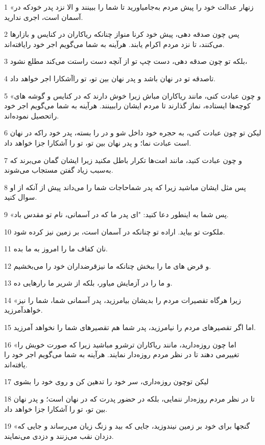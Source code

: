 \par 1 «زنهار عدالت خود را پیش مردم به‌جامیاورید تا شما را ببینند و الا نزد پدر خودکه در آسمان است، اجری ندارید.
\par 2 پس چون صدقه دهی، پیش خود کرنا منواز چنانکه ریاکاران در کنایس و بازارها می‌کنند، تا نزد مردم اکرام یابند. هرآینه به شما می‌گویم اجر خود رایافته‌اند.
\par 3 بلکه تو چون صدقه دهی، دست چپ تو از آنچه دست راستت می‌کند مطلع نشود،
\par 4 تاصدقه تو در نهان باشد و پدر نهان بین تو، تو راآشکارا اجر خواهد داد.
\par 5 «و چون عبادت کنی، مانند ریاکاران مباش زیرا خوش دارند که در کنایس و گوشه های کوچه‌ها ایستاده، نماز گذارند تا مردم ایشان راببینند. هرآینه به شما می‌گویم اجر خود راتحصیل نموده‌اند.
\par 6 لیکن تو چون عبادت کنی، به حجره خود داخل شو و در را بسته، پدر خود راکه در نهان است عبادت نما؛ و پدر نهان بین تو، تو را آشکارا جزا خواهد داد.
\par 7 و چون عبادت کنید، مانند امت‌ها تکرار باطل مکنید زیرا ایشان گمان می‌برند که به‌سبب زیاد گفتن مستجاب می‌شوند.
\par 8 پس مثل ایشان مباشید زیرا که پدر شماحاجات شما را می‌داند پیش از آنکه از او سوال کنید.
\par 9 «پس شما به اینطور دعا کنید: "ای پدر ما که در آسمانی، نام تو مقدس باد.
\par 10 ملکوت تو بیاید. اراده تو چنانکه در آسمان است، بر زمین نیز کرده شود.
\par 11 نان کفاف ما را امروز به ما بده.
\par 12 و قرض های ما را ببخش چنانکه ما نیزقرضداران خود را می‌بخشیم.
\par 13 و ما را در آزمایش میاور، بلکه از شریر ما رارهایی ده.
\par 14 «زیرا هرگاه تقصیرات مردم را بدیشان بیامرزید، پدر آسمانی شما، شما را نیز خواهدآمرزید.
\par 15 اما اگر تقصیرهای مردم را نیامرزید، پدر شما هم تقصیرهای شما را نخواهد آمرزید.
\par 16 «اما چون روزه‌دارید، مانند ریاکاران ترشرو مباشید زیرا که صورت خویش را تغییرمی دهند تا در نظر مردم روزه‌دار نمایند. هرآینه به شما می‌گویم اجر خود را یافته‌اند.
\par 17 لیکن توچون روزه‌داری، سر خود را تدهین کن و روی خود را بشوی
\par 18 تا در نظر مردم روزه‌دار ننمایی، بلکه در حضور پدرت که در نهان است؛ و پدر نهان بین تو، تو را آشکارا جزا خواهد داد.
\par 19 «گنجها برای خود بر زمین نیندوزید، جایی که بید و زنگ زیان می‌رساند و جایی که دزدان نقب می‌زنند و دزدی می‌نمایند.

